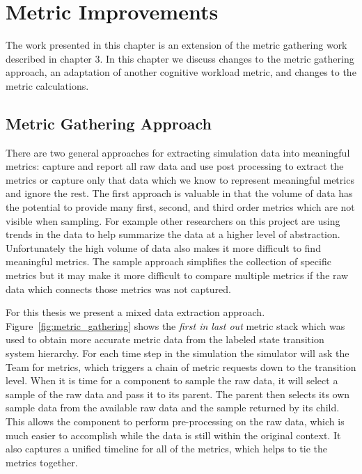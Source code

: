 \chapter{Metric Improvements} \label{ch:metrics}

The work presented in this chapter is an extension of the metric gathering work described in chapter 3.  In this chapter we discuss changes to the metric gathering approach, an adaptation of another cognitive workload metric, and changes to the metric calculations.

\section{Metric Gathering Approach}

There are two general approaches for extracting simulation data into meaningful metrics: capture and report all raw data and use post processing to extract the metrics or capture only that data which we know to represent meaningful metrics and ignore the rest.  The first approach is valuable in that the volume of data has the potential to provide many first, second, and third order metrics which are not visible when sampling.  For example other researchers on this project are using trends in the data to help summarize the data at a higher level of abstraction.  Unfortunately the high volume of data also makes it more difficult to find meaningful metrics.  The sample approach simplifies the collection of specific metrics but it may make it more difficult to compare multiple metrics if the raw data which connects those metrics was not captured.

For this thesis we present a mixed data extraction approach.  Figure~\ref{fig:metric_gathering} shows the \textit{first in last out} metric stack which was used to obtain more accurate metric data from the labeled state transition system hierarchy.  For each time step in the simulation the simulator will ask the Team for metrics, which triggers a chain of metric requests down to the transition level.  When it is time for a component to sample the raw data, it will select a sample of the raw data and pass it to its parent.  The parent then selects its own sample data from the available raw data and the sample returned by its child.  This allows the component to perform pre-processing on the raw data, which is much easier to accomplish while the data is still within the original context.  It also captures a unified timeline for all of the metrics, which helps to tie the metrics together.  

